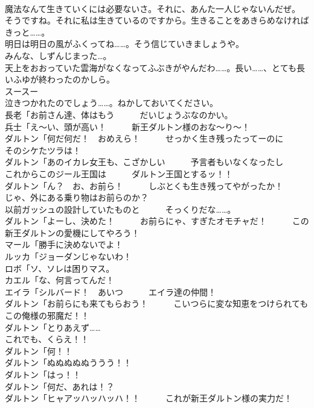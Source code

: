 \documentclass[8pt]{extreport}
\begin{document}
\begin{CJK}{UTF8}{min}
\\	魔法なんて生きていくには必要ないさ。それに、あんた一人じゃないんだぜ。	
\\	そうですね。それに私は生きているのですから。生きることをあきらめなければきっと……。	
\\	明日は明日の風がふくってね……。そう信じていきましょうや。	
\\	みんな、しずんじまった…。	
\\	天上をおおっていた雲海がなくなってふぶきがやんだわ……。長い……、とても長いふゆが終わったのかしら。	
\\	スースー	
\\	泣きつかれたのでしょう……。ねかしておいてください。	
\\	長老「お前さん達、体はもう　　　だいじょうぶなのかい。	
\\	兵士「え～い、頭が高い！　　　新王ダルトン様のおな～り～！	
\\	ダルトン「何だ何だ！　おめえら！　　　せっかく生き残ったってーのに　　　そのシケたツラは！	
\\	ダルトン「あのイカレ女王も、こざかしい　　　予言者もいなくなったし　　　これからこのジール王国は　　　ダルトン王国とするッ！！	
\\	ダルトン「ん？　お、お前ら！　　　しぶとくも生き残ってやがったか！　　　じゃ、外にある乗り物はお前らのか？	
\\	以前ガッシュの設計していたものと　　　そっくりだな……。	
\\	ダルトン「よーし、決めた！　　　お前らにゃ、すぎたオモチャだ！　　　この新王ダルトンの愛機にしてやろう！	
\\	マール「勝手に決めないでよ！	
\\	ルッカ「ジョーダンじゃないわ！	
\\	ロボ「ソ、ソレは困りマス。	
\\	カエル「な、何言ってんだ！	
\\	エイラ「シルバード！　あいつ　　　エイラ達の仲間！	
\\	ダルトン「お前らにも来てもらおう！　　　こいつらに変な知恵をつけられても　　　この俺様の邪魔だ！！	
\\	ダルトン「とりあえず……	
\\	これでも、くらえ！！	
\\	ダルトン「何！！	
\\	ダルトン「ぬぬぬぬぬううう！！	
\\	ダルトン「はっ！！	
\\	ダルトン「何だ、あれは！？	
\\	ダルトン「ヒャアッハッハッハ！！　　　これが新王ダルトン様の実力だ！	

\end{CJK}
\end{document}
